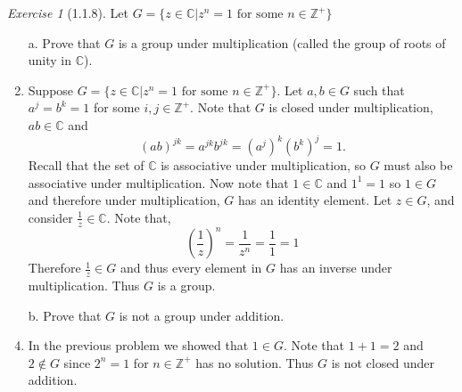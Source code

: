 \documentclass[12pt]{amsart}
\makeatletter
\theoremstyle{remark}
\newtheorem*{exercise}{Exercise}%
\def\ZZ{\ensuremath{\mathbb Z}}
\def\CC{\ensuremath{\mathbb C}}
\renewenvironment{proof}[1][\proofname]{\par\doublespacing
  \pushQED{\qed}%
  \normalfont \topsep6\p@\@plus6\p@\relax
  \list{}{%
    \settowidth{\leftmargin}{\itshape\proofname:\hskip\labelsep}%
    \setlength{\labelwidth}{0pt}%
    \setlength{\itemindent}{-\leftmargin}%
  }%
  \item[\hskip\labelsep\itshape#1\@addpunct{:}]\ignorespaces
}{%
  \popQED\endlist\@endpefalse
  \singlespacing
}
\theoremstyle{mycomment}
\makeatother
\begin{document}
\begin{exercise}[1.1.8] Let $G =\{z \in \CC | z^n = 1 \text{ for some } n \in \ZZ^+\}$
  \begin{enumerate}
    \item[a.] Prove that $G$ is a group under multiplication (called the group of roots of unity in $\CC$).
    \begin{proof} Suppose $G =\{z \in \CC | z^n = 1 \text{ for some } n \in \ZZ^+\}$. Let $a, b \in G$ such that 
      $a^j = b^k = 1$ for some $i, j \in \ZZ^+$. Note that $G$ is closed under multiplication, $ab \in \CC$ and
      \begin{equation*}
        (ab)^{jk} = a^{jk}b^{jk} = (a^j)^k(b^k)^j = 1.
      \end{equation*} 
      Recall that the set of $\CC$ is associative under multiplication, so $G$ must also be associative under multiplication.
      Now note that $1 \in \CC$ and $1^1 = 1$ so $1 \in G$ and therefore under multiplication, $G$ has an identity element. Let $z \in G$, and 
      consider $\frac{1}{z} \in \CC$. Note that, 
      \begin{equation*}
        \left(\frac{1}{z}\right)^n = \frac{1}{z^n} = \frac{1}{1} = 1 
      \end{equation*}
      Therefore $\frac{1}{z} \in G$ and thus every element in $G$ has an inverse under multiplication. Thus $G$ is a group. 
    \end{proof}
    \vspace{.15in}
    \item[b.] Prove that $G$ is not a group under addition. 
    \begin{proof}
      In the previous problem we showed that $1 \in G$. Note that $1 + 1 = 2$ and $2 \not\in G$ since $2^n = 1$ for $n \in \ZZ^+$ has 
      no solution. Thus $G$ is not closed under addition.
    \end{proof}
  \end{enumerate}
\end{exercise}
\end{document}
